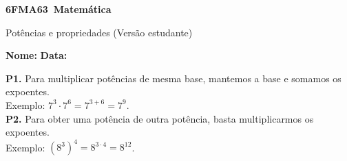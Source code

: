 \documentclass[a4paper,14pt]{article}
\begin{document}
	
	\noindent\textbf{6FMA63~Matemática} 
	
	\begin{center}Potências e propriedades (Versão estudante)
	\end{center}
	
	\noindent\textbf{Nome:} \underline{\hspace{10cm}}
	\noindent\textbf{Data:} \underline{\hspace{4cm}}
	
	
	
    \begin{multicols}{2}
    	\noindent\textbf{P1.} Para multiplicar potências de mesma base, mantemos a base e somamos os expoentes. \\
    	Exemplo: $7^3 \cdot 7^6 = 7^{3 + 6} = 7^9$. \\
    	\textbf{P2.} Para obter uma potência de outra potência, basta multiplicarmos os expoentes. \\
    	Exemplo: $(8^3)^4 = 8^{3 \cdot 4} = 8^12$.
    	

\end{multicols}
\end{document}
